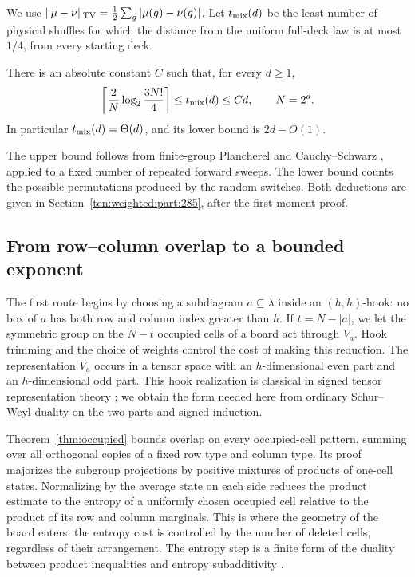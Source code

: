 We use
$\|\mu-\nu\|_{\rm TV}=\tfrac12\sum_g|\mu(g)-\nu(g)|$.
Let $t_{\rm mix}(d)$ be the least number of physical shuffles for which
the distance from the uniform full-deck law is at most $1/4$, from every
starting deck.
\begin{corollary}\label{cor:optimal-mixing}
There is an absolute constant $C$ such that, for every $d\ge1$,
\[
 \left\lceil\frac2N\log_2\frac{3N!}{4}\right\rceil
 \le t_{\rm mix}(d)\le Cd,
 \qquad N=2^d.
\]
In particular $t_{\rm mix}(d)=\Theta(d)$, and its lower bound is
$2d-O(1)$.
\end{corollary}
The upper bound follows from finite-group Plancherel and Cauchy--Schwarz
\cite[Sections~2 and~3]{DiaconisShahshahani1981}, applied to a fixed
number of repeated forward sweeps. The lower bound counts the possible
permutations produced by the random switches. Both deductions are given
in Section~\ref{ten:weighted:part:285}, after the first moment proof.

\subsection{From row--column overlap to a bounded exponent}
The first route begins by choosing a subdiagram $a\subseteq\lambda$
inside an $(h,h)$-hook: no box of $a$ has both row and column index
greater than $h$. If $t=N-|a|$, we let the symmetric group on the
$N-t$ occupied cells of a board act through $V_a$. Hook trimming and the
choice of weights control the cost of making this reduction. The
representation $V_a$ occurs in a tensor space with an $h$-dimensional
even part and an $h$-dimensional odd part. This hook realization is
classical in signed tensor representation theory \cite{BereleRegev1987};
we obtain the form needed here from ordinary Schur--Weyl duality on the
two parts and signed induction.

Theorem~\ref{thm:occupied} bounds overlap on every occupied-cell pattern,
summing over all orthogonal copies of a fixed row type and column type.
Its proof majorizes the subgroup projections by positive mixtures of
products of one-cell states. Normalizing by the average state on each side reduces
the product estimate to the entropy of a uniformly chosen occupied cell
relative to the product of its row and column marginals. This is where
the geometry of the board enters: the entropy cost is controlled by the
number of deleted cells, regardless of their arrangement. The entropy step
is a finite form of the duality between product inequalities and entropy
subadditivity \cite[Theorem~2.1 and (2.4)]{CarlenCorderoErausquin2009}.

